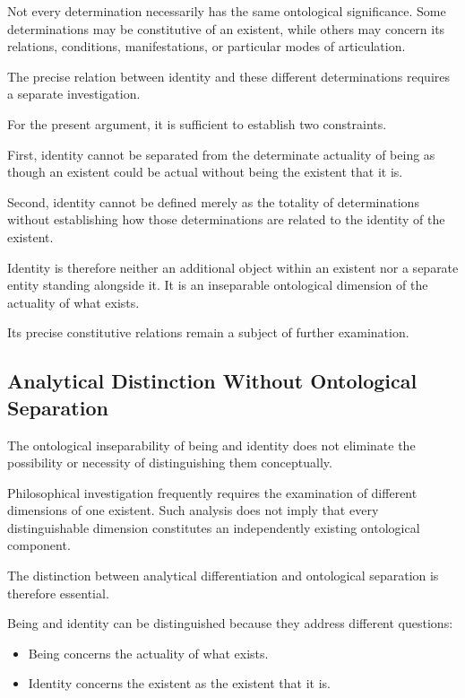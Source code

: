 Not every determination necessarily
has the same ontological significance.
Some determinations may be constitutive
of an existent, while others may concern
its relations, conditions, manifestations,
or particular modes of articulation.

The precise relation between identity
and these different determinations
requires a separate investigation.

For the present argument, it is sufficient
to establish two constraints.

First, identity cannot be separated
from the determinate actuality of being
as though an existent could be actual
without being the existent that it is.

Second, identity cannot be defined merely
as the totality of determinations without
establishing how those determinations
are related to the identity of the existent.

Identity is therefore neither an additional
object within an existent nor a separate
entity standing alongside it. It is an
inseparable ontological dimension of
the actuality of what exists.

Its precise constitutive relations remain
a subject of further examination.



\subsection{Analytical Distinction Without Ontological Separation}

The ontological inseparability of being
and identity does not eliminate the
possibility or necessity of distinguishing
them conceptually.

Philosophical investigation frequently
requires the examination of different
dimensions of one existent. Such analysis
does not imply that every distinguishable
dimension constitutes an independently
existing ontological component.

The distinction between analytical
differentiation and ontological separation
is therefore essential.

Being and identity can be distinguished
because they address different questions:

\begin{itemize}
    \item Being concerns the actuality
    of what exists.

    \item Identity concerns the existent
    as the existent that it is.
\end{itemize}

